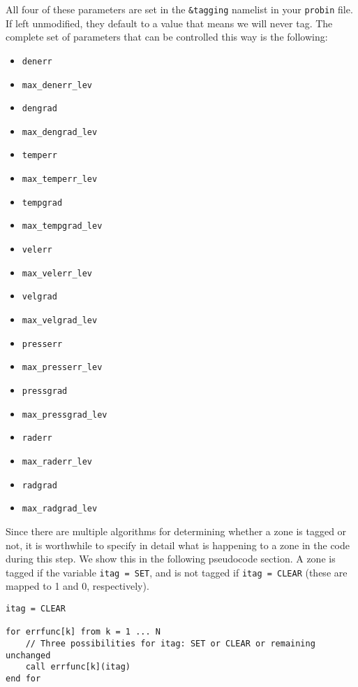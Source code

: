 All four of these parameters are set in the {\tt \&tagging} namelist 
in your {\tt probin} file. If left unmodified, they default to a value 
that means we will never tag. The complete set of parameters that can 
be controlled this way is the following:
\begin{multicols}{5}
\begin{itemize}
  \setlength{\itemindent}{-3em}
  \item {\tt denerr}
  \item {\tt max\_denerr\_lev}
  \item {\tt dengrad}
  \item {\tt max\_dengrad\_lev}
  \item {\tt temperr}
  \item {\tt max\_temperr\_lev}
  \item {\tt tempgrad}
  \item {\tt max\_tempgrad\_lev}
  \item {\tt velerr}
  \item {\tt max\_velerr\_lev}
  \item {\tt velgrad}
  \item {\tt max\_velgrad\_lev}
  \item {\tt presserr}
  \item {\tt max\_presserr\_lev}
  \item {\tt pressgrad}
  \item {\tt max\_pressgrad\_lev}
  \item {\tt raderr}
  \item {\tt max\_raderr\_lev}
  \item {\tt radgrad}
  \item {\tt max\_radgrad\_lev}
\end{itemize}
\end{multicols}
Since there are multiple algorithms for determining 
whether a zone is tagged or not, it is worthwhile to specify 
in detail what is happening to a zone in the code during this step. 
We show this in the following pseudocode section. A zone 
is tagged if the variable {\tt itag = SET}, and is not tagged 
if {\tt itag = CLEAR} (these are mapped to 1 and 0, respectively).

\begin{verbatim}
itag = CLEAR

for errfunc[k] from k = 1 ... N
    // Three possibilities for itag: SET or CLEAR or remaining unchanged
    call errfunc[k](itag)  
end for
\end{verbatim}


